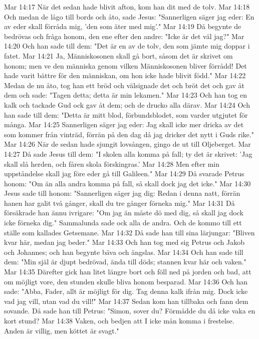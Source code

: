 Mar 14:17  När det sedan hade blivit afton, kom han dit med de tolv.
Mar 14:18  Och medan de lågo till bords och åto, sade Jesus: "Sannerligen säger jag eder: En av eder skall förråda mig, 'den som äter med mig'."
Mar 14:19  Då begynte de bedrövas och fråga honom, den ene efter den andre: "Icke är det väl jag?"
Mar 14:20  Och han sade till dem: "Det är en av de tolv, den som jämte mig doppar i fatet.
Mar 14:21  Ja, Människosonen skall gå bort, såsom det är skrivet om honom; men ve den människa genom vilken Människosonen bliver förrådd! Det hade varit bättre för den människan, om hon icke hade blivit född."
Mar 14:22  Medan de nu åto, tog han ett bröd och välsignade det och bröt det och gav åt dem och sade: "Tagen detta; detta är min lekamen."
Mar 14:23  Och han tog en kalk och tackade Gud ock gav åt dem; och de drucko alla därav.
Mar 14:24  Och han sade till dem: "Detta är mitt blod, förbundsblodet, som varder utgjutet för många.
Mar 14:25  Sannerligen säger jag eder: Jag skall icke mer dricka av det som kommer från vinträd, förrän på den dag då jag dricker det nytt i Guds rike."
Mar 14:26  När de sedan hade sjungit lovsången, gingo de ut till Oljeberget.
Mar 14:27  Då sade Jesus till dem: "I skolen alla komma på fall; ty det är skrivet: 'Jag skall slå herden, och fåren skola förskingras.'
Mar 14:28  Men efter min uppståndelse skall jag före eder gå till Galileen."
Mar 14:29  Då svarade Petrus honom: "Om än alla andra komma på fall, så skall dock jag det icke."
Mar 14:30  Jesus sade till honom: "Sannerligen säger jag dig: Redan i denna natt, förrän hanen har galit två gånger, skall du tre gånger förneka mig."
Mar 14:31  Då försäkrade han ännu ivrigare: "Om jag än måste dö med dig, så skall jag dock icke förneka dig." Sammalunda sade ock alla de andra. Och de kommo till ett ställe som kallades Getsemane.
Mar 14:32  Då sade han till sina lärjungar: "Bliven kvar här, medan jag beder."
Mar 14:33  Och han tog med sig Petrus och Jakob och Johannes; och han begynte bäva och ängslas.
Mar 14:34  Och han sade till dem: "Min själ är djupt bedrövad, ända till döds; stannen kvar här och vaken."
Mar 14:35  Därefter gick han litet längre bort och föll ned på jorden och bad, att om möjligt vore, den stunden skulle bliva honom besparad.
Mar 14:36  Och han sade: "Abba, Fader, allt är möjligt för dig. Tag denna kalk ifrån mig. Dock icke vad jag vill, utan vad du vill!"
Mar 14:37  Sedan kom han tillbaka och fann dem sovande. Då sade han till Petrus: "Simon, sover du? Förmådde du då icke vaka en kort stund?
Mar 14:38  Vaken, och bedjen att I icke mån komma i frestelse. Anden är villig, men köttet är svagt."

